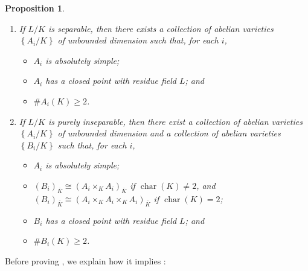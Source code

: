 \documentclass[11pt, reqno]{amsart}
\numberwithin{equation}{section}
\newtheorem{pro}[teo]{Proposition}
\theoremstyle{definition}
\theoremstyle{remark}
\renewcommand{\bar}[1]{{\overline{#1}}}
\newcommand{\st}[1]{\left\{#1\right\}}
\begin{document}
\begin{pro}
\label{P:rkcondremix}
\begin{enumerate}[label={(\alph*)}]
  Let $L/K$ be a finite simple extension.
       \item If $L/K$ is separable, then there exists a collection of abelian varieties $\st{A_i/K}$ of unbounded dimension such that, for each $i$, \label{P:rkcond1}
\begin{itemize}
\item $A_i$ is absolutely simple;
\item $A_i$ has a closed point with residue field $L$; and
\item $\# A_i(K) \ge 2$.
\end{itemize}

\item If $L/K$ is purely inseparable, then there exist a collection of abelian varieties $\st{A_i/K}$  of unbounded dimension and a collection of abelian varieties $\st{B_i/K}$ such that, for each $i$, \label{P:rkcond2}
\begin{itemize}
\item $A_i$ is absolutely simple;
\item $(B_i)_{\bar K}\cong (A_i\times_KA_i)_{\bar K}$ if $\operatorname{char}(K)\ne 2$, and $(B_i)_{\bar K}\cong  (A_i\times_KA_i\times_KA_i)_{\bar K}$ if $\operatorname{char}(K)=2$;
\item $B_i$ has a closed point with residue field $L$; and
\item $\# B_i(K) \ge 2$.
\end{itemize}

\end{enumerate}
\end{pro}

Before proving , we explain how it implies :
\end{document}
